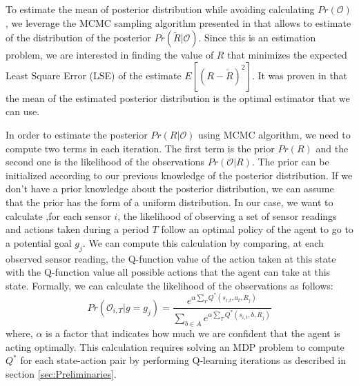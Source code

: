 \documentclass[letterpaper, 10 pt, conference]{ieeeconf}  %
\newcommand\NB[1]{$\spadesuit$\footnote{NB: #1}}
\begin{document}
To estimate the mean of posterior distribution while avoiding calculating $Pr(\mathcal{O})$, we leverage the MCMC sampling algorithm presented in \cite{andrieu2003introduction} that allows to estimate of the distribution of the posterior $Pr(\tilde{R}|\mathcal{O})$. Since this is an estimation problem, we are interested in finding the value of $R$ that minimizes the expected Least Square Error (LSE) of the estimate $E[(R-\tilde{R})^2]$. It was proven in \cite{Ramachandran2007} that the mean of the estimated posterior distribution is the optimal estimator that we can use.

In order to estimate the posterior $Pr(R|\mathcal{O})$ using MCMC algorithm, we need to compute two terms in each iteration. The first term is the prior $Pr(R)$ and the second one is the likelihood of the observations $Pr(\mathcal{O}|R)$.
The prior can be initialized according to our previous knowledge of the posterior distribution. If we don't have a prior knowledge about the posterior distribution, we can assume that the prior has the form of a uniform distribution.
In our case, we want to calculate ,for each sensor $i$, the likelihood of observing a set of sensor readings and actions taken during a period $T$ follow an optimal policy of the agent to go to a potential goal $g_j$. We can compute this calculation by comparing, at each observed sensor reading, the Q-function value of the action taken at this state with the Q-function value all possible actions that the agent can take at this state. Formally, we can calculate the likelihood of the observations as follows:
\begin{equation}
Pr(\mathcal{O}_{i,T} | g = g_j)  = \frac{e^{\alpha\sum_{T}{Q^*(s_{i,t},a_t,R_j)}}}{\sum_{b\in A}{}e^{\alpha\sum_{T}{}Q^*(s_{i,t},b,R_j)}}
\label{eqn:likelihood}
\end{equation}
where, $\alpha$ is a factor that indicates how much we are confident that the agent is acting optimally. This calculation requires solving an MDP problem to compute $Q^*$ for each state-action pair by performing Q-learning iterations as described in section \ref{sec:Preliminaries}.




%
\end{document}
